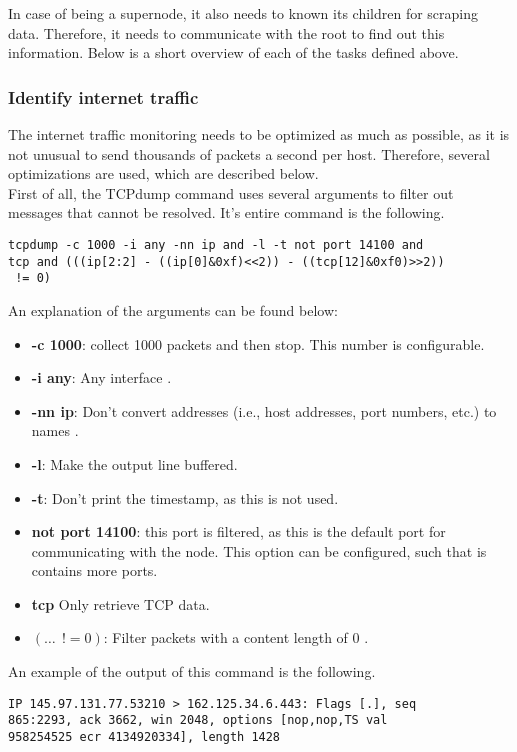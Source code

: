 In case of being a supernode, it also needs to known its children for scraping data. Therefore, it needs to communicate with the root to find out this information. Below is a short overview of each of the tasks defined above.

\subsubsection{Identify internet traffic}
The internet traffic monitoring needs to be optimized as much as possible, as it is not unusual to send thousands of packets a second per host. Therefore, several optimizations are used, which are described below.\\

\noindent
First of all, the TCPdump command uses several arguments to filter out messages that cannot be resolved. It's entire command is the following.
\begin{verbatim}
tcpdump -c 1000 -i any -nn ip and -l -t not port 14100 and
tcp and (((ip[2:2] - ((ip[0]&0xf)<<2)) - ((tcp[12]&0xf0)>>2))
 != 0)
\end{verbatim}
An explanation of the arguments can be found below:
\begin{itemize}
    \item \textbf{-c 1000}: collect 1000 packets and then stop. This number is configurable.
    \item \textbf{-i any}: Any interface \cite{tcpmanpage}.
    \item \textbf{-nn ip}: Don't convert addresses (i.e., host addresses, port numbers, etc.) to names \cite{tcpmanpage}.
    \item \textbf{-l}: Make the output line buffered.
    \item \textbf{-t}: Don't print the timestamp, as this is not used.
    \item \textbf{not port 14100}: this port is filtered, as this is the default port for communicating with the node. This option can be configured, such that is contains more ports.
    \item \textbf{tcp} Only retrieve TCP data.
    \item \textbf{$(\dots~~!= 0)$}: Filter packets with a content length of 0 \cite{tcpdump-filter}.
\end{itemize}
An example of the output of this command is the following.
\begin{verbatim}
IP 145.97.131.77.53210 > 162.125.34.6.443: Flags [.], seq
865:2293, ack 3662, win 2048, options [nop,nop,TS val
958254525 ecr 4134920334], length 1428
\end{verbatim}
